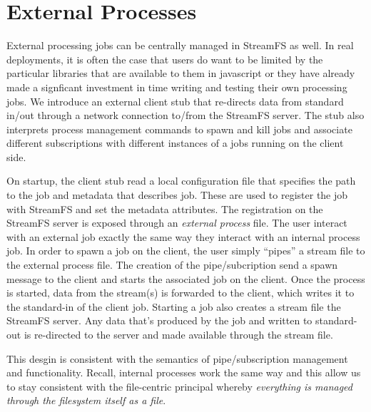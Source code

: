 \section{External Processes}

External processing jobs can be centrally managed in StreamFS as well.  In real deployments, it is often the case that
users do want to be limited by the particular libraries that are available to them in javascript or they have already made
a signficant investment in time writing and testing their own processing jobs.  We introduce an external client stub that 
re-directs data from standard in/out through a network connection to/from the StreamFS server.  The stub also interprets
process management commands to spawn and kill jobs and associate different subscriptions with different instances of a jobs 
running on the client side.

On startup, the client stub read a local configuration file that specifies the path to the job and metadata that describes
job.  These are used to register the job with StreamFS and set the metadata attributes.  The registration on the StreamFS 
server is exposed through an \emph{external process} file.  The user interact with an external job exactly the same way they
interact with an internal process job.  In order to spawn a job on the client, the user simply ``pipes'' a stream file 
to the external process file.  The creation of the pipe/subcription send a spawn message to the client and starts the associated
job on the client.  Once the process is started, data from the stream(s) is forwarded to the client, which writes it to the 
standard-in of the client job.  Starting a job also creates a stream file the StreamFS server.  Any data that's produced by the job
and written to standard-out is re-directed to the server and made available through the stream file.

This desgin is consistent with the semantics of pipe/subscription management and functionality.  Recall, internal processes
work the same way and this allow us to stay consistent with the file-centric principal whereby \emph{everything is managed
through the filesystem itself as a file}.


